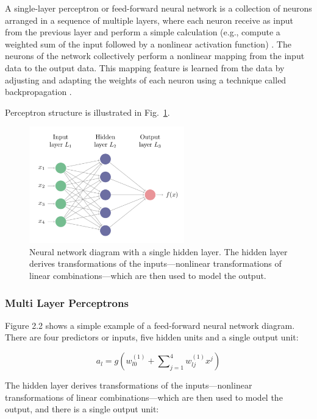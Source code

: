 A single-layer perceptron or feed-forward neural network is a collection of neurons arranged in a sequence of multiple layers, where each neuron receive as input from the previous layer and perform a simple calculation (e.g., compute a weighted sum of the input followed by a nonlinear activation function) \cite{efron2016computer}. The neurons of the network collectively perform a nonlinear mapping from the input data to the output data. This mapping feature is learned from the data by adjusting and adapting the weights of each neuron using a technique called backpropagation \cite{efron2016computer}.

Perceptron structure is illustrated in Fig.~\ref{fig:perceptron}.

\begin{figure}[htbp]
\centering
\includegraphics[width=0.6\textwidth]{images/perceptron.png}
\caption{Neural network diagram with a single hidden layer. The hidden layer derives transformations of the inputs—nonlinear transformations of linear combinations—which are then used to model the output.}
\label{fig:perceptron}
\end{figure}

\subsubsection*{Multi Layer Perceptrons}

Figure 2.2 shows a simple example of a feed-forward neural network diagram. There are four predictors or inputs, five hidden units and a single output unit:

\begin{equation}
a_{l} =g\left( w^{( 1)}_{l0} +\sum\nolimits ^{4}_{j=1} w^{( 1)}_{lj} x^{j}\right)
\label{four input units and five hidden units}
\end{equation}

The hidden layer derives transformations of the
inputs—nonlinear transformations of linear combinations—which are then used to model the output, and there is a single output unit:

